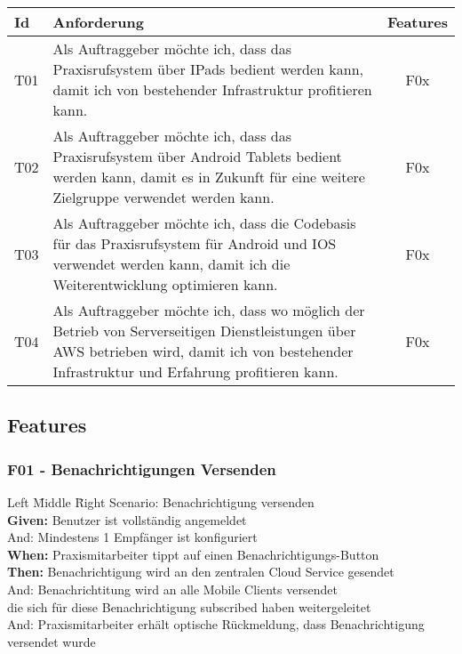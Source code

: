 \begin{table}[h]
    \centering
    \begin{tabular}{|l|p{13cm}|c|}
        \hline
        \textbf{Id} & \textbf{Anforderung}                                                              & \textbf{Features} \\
        \hline
        T01         & Als Auftraggeber möchte ich, dass das Praxisrufsystem über IPads bedient werden kann, damit ich von bestehender Infrastruktur profitieren kann. & F0x \\
        \hline
        T02         & Als Auftraggeber möchte ich, dass das Praxisrufsystem über Android Tablets bedient werden kann, damit es in Zukunft für eine weitere Zielgruppe verwendet werden kann. & F0x \\
        \hline
        T03         & Als Auftraggeber möchte ich, dass die Codebasis für das Praxisrufsystem für Android und IOS verwendet werden kann, damit ich die Weiterentwicklung optimieren kann. & F0x \\
        \hline
        T04         & Als Auftraggeber möchte ich, dass wo möglich der Betrieb von Serverseitigen Dienstleistungen über AWS betrieben wird, damit ich von bestehender Infrastruktur und Erfahrung profitieren kann. & F0x               \\
        \hline
    \end{tabular}\label{tab:userstories3}
\end{table}

\clearpage

\subsection{Features}\label{subsec:features}

    \subsubsection*{F01 - Benachrichtigungen Versenden}
        \begin{tabbing}
            Left \= Middle \= Right \kill
            Scenario: \> \> Benachrichtigung versenden\\
            \textbf{Given:}  \> \> Benutzer ist vollständig angemeldet\\
            And:    \> \> Mindestens 1 Empfänger ist konfiguriert\\
            \textbf{When:}  \> \> Praxismitarbeiter tippt auf einen Benachrichtigungs-Button\\
            \textbf{Then:}   \> \> Benachrichtigung wird an den zentralen Cloud Service gesendet\\
            And:    \> \> Benachrichtitung wird an alle Mobile Clients versendet\\
                  \> \> die sich für diese Benachrichtigung subscribed haben weitergeleitet\\
            And:    \> \> Praxismitarbeiter erhält optische Rückmeldung, dass Benachrichtigung versendet wurde\\
        \end{tabbing}



